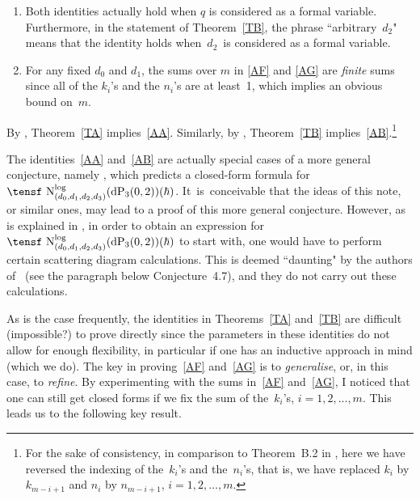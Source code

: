 \documentclass[10pt,a4paper]{amsart}
\begin{document}
\begin{Remarks}\quad
\begin{enumerate}\itemsep=0pt
\item[(1)] Both identities actually hold when $q$ is considered as a formal variable.
Furthermore, in the statement of Theorem~\ref{TB}, the phrase ``arbitrary~$d_2$"
means that the identity holds when~$d_2$~is considered as a formal variable.

\item[(2)] For any fixed $d_0$ and $d_1$,
the sums over $m$ in \eqref{AF} and \eqref{AG} are {\it finite} sums since
all of the $k_i$'s and the $n_i$'s are at least~1, which implies
an obvious bound on~$m$.
\end{enumerate}
\end{Remarks}

By \cite[Theorem~B.1]{BoBGAA}, Theorem~\ref{TA} implies~\eqref{AA}.
Similarly, by \cite[Theorem~B.2]{BoBGAA}, Theorem~\ref{TB}
implies~\eqref{AB}.\footnote{For the sake of consistency, in
comparison to Theorem~B.2 in \cite{BoBGAA},
here we have reversed the indexing of the~$k_i$'s and the~$n_i$'s,
that is, we have replaced $k_i$ by $k_{m-i+1}$ and $n_i$ by
$n_{m-i+1}$, $i=1,2,\dots,m$.}

The identities~\eqref{AA} and~\eqref{AB} are actually special cases of a more
general conjecture, namely \mbox{\cite[Conjecture~4.7]{BoBGAA}}, which
predicts a closed-form formula for
$\text{\tensf
N}_{(d_0,d_1,d_2,d_3)}^{\log}(\text{dP}_3(0,2))(\hbar)$.
It~is~con\-ceiv\-able that the ideas of this note, or similar ones,
may lead to a proof of this more general conjecture. However, as is
explained in \cite[Section~4.2]{BoBGAA}, in order to obtain an
expression for~$\text{\tensf
N}_{(d_0,d_1,d_2,d_3)}^{\log}(\text{dP}_3(0,2))(\hbar)$
to start with,
one would have to perform certain scattering diagram calculations.
This is deemed ``daunting" by the authors of~\cite{BoBGAA} (see the
paragraph below Conjecture~4.7), and they do not carry out these
calculations.


As is the case frequently, the identities in Theorems~\ref{TA} and~\ref{TB}
are difficult (impossible?) to prove directly since the parameters
in these identities do not allow for enough flexibility, in particular
if one has an inductive approach in mind (which we do).
The key in proving~\eqref{AF}
and~\eqref{AG} is to {\it generalise}, or, in this case, to {\it refine}.
By experimenting with the sums in~\eqref{AF} and~\eqref{AG}, I noticed that
one can still get closed forms if we fix the sum of the~$k_i$'s,
$i=1,2,\dots,m$. This leads us to the following key result.
\end{document}
